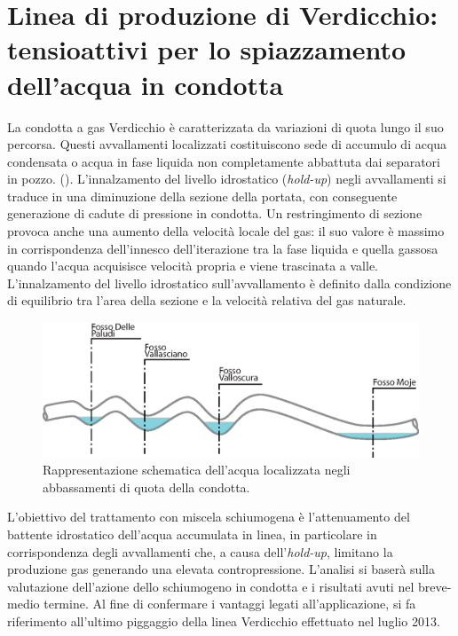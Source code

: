 \clearpage{\pagestyle{empty}\cleardoublepage}
\chapter{Linea di produzione di Verdicchio: tensioattivi per lo spiazzamento dell'acqua in condotta}\thispagestyle{empty} 
 La condotta a gas Verdicchio è caratterizzata da variazioni di quota lungo il suo percorsa. Questi avvallamenti localizzati costituiscono sede di accumulo di acqua condensata o acqua in fase liquida non completamente abbattuta dai separatori in pozzo. (). L'innalzamento del livello idrostatico (\textit{hold-up}) negli avvallamenti si traduce in una diminuzione della sezione della portata, con conseguente generazione di cadute di pressione in condotta. Un restringimento di sezione provoca anche una aumento della velocità locale del gas: il suo valore è massimo in corrispondenza dell'innesco dell'iterazione tra la fase liquida e quella gassosa quando l'acqua acquisisce velocità propria e viene trascinata a valle. L'innalzamento del livello idrostatico sull'avvallamento è definito dalla condizione di equilibrio tra l'area della sezione e la velocità relativa del gas naturale.\\
\begin{figure}[htbp] 
    \centering
    \includegraphics[width=\textwidth]{fig/test/avvallamenti.eps}
    \caption{Rappresentazione schematica dell'acqua localizzata negli abbassamenti di quota della condotta.} 
    \label{fig:acqua-avvallamenti}
\end{figure}
L'obiettivo del trattamento con miscela schiumogena è l'attenuamento del battente idrostatico dell'acqua accumulata in linea, in particolare in corrispondenza degli avvallamenti che, a causa dell'\textit{hold-up}, limitano la produzione gas generando una elevata contropressione. L'analisi si baserà sulla valutazione dell'azione dello schiumogeno in condotta e i risultati avuti nel breve-medio termine. Al fine di confermare i vantaggi legati all'applicazione, si fa riferimento all'ultimo piggaggio della linea Verdicchio effettuato nel luglio 2013.\\
